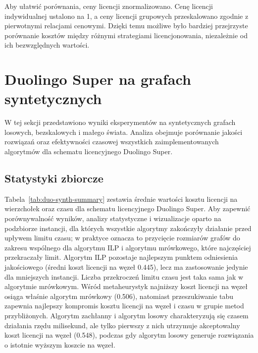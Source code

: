 Aby ułatwić porównania, ceny licencji znormalizowano. Cenę licencji indywidualnej ustalono na 1, a ceny licencji grupowych przeskalowano zgodnie z pierwotnymi relacjami cenowymi. Dzięki temu możliwe było bardziej przejrzyste porównanie kosztów między różnymi strategiami licencjonowania, niezależnie od ich bezwzględnych wartości.

\section{Duolingo Super na grafach syntetycznych}

W tej sekcji przedstawiono wyniki eksperymentów na syntetycznych grafach losowych, bezskalowych i małego świata. Analiza obejmuje porównanie jakości rozwiązań oraz efektywności czasowej wszystkich zaimplementowanych algorytmów dla schematu licencyjnego Duolingo Super.

\subsection{Statystyki zbiorcze}
Tabela~\ref{tab:duo-synth-summary} zestawia średnie wartości kosztu licencji na wierzchołek oraz czasu dla schematu licencyjnego Duolingo Super. Aby zapewnić porównywalność wyników, analizy statystyczne i wizualizacje oparto na podzbiorze instancji, dla których wszystkie algorytmy zakończyły działanie przed upływem limitu czasu; w praktyce oznacza to przycięcie rozmiarów grafów do zakresu wspólnego dla algorytmu ILP i algorytmu mrówkowego, które najczęściej przekraczały limit. Algorytm ILP pozostaje najlepszym punktem odniesienia jakościowego (średni koszt licencji na węzeł 0.445), lecz ma zastosowanie jedynie dla mniejszych instancji. Liczba przekroczeń limitu czasu jest taka sama jak w algorytmie mrówkowym. Wśród metaheurystyk najniższy koszt licencji na węzeł osiąga właśnie algorytm mrówkowy (0.506), natomiast przeszukiwanie tabu zapewnia najlepszy kompromis kosztu licencji na węzeł i czasu w grupie metod przybliżonych. Algorytm zachłanny i algorytm losowy charakteryzują się czasem działania rzędu milisekund, ale tylko pierwszy z nich utrzymuje akceptowalny koszt licencji na węzeł (0.548), podczas gdy algorytm losowy generuje rozwiązania o istotnie wyższym koszcie na węzeł.

